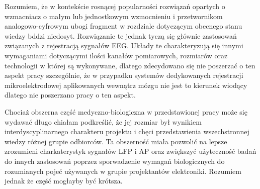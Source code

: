 \begin{frame}[t]
    \begin{block}{\dk}
    \end{block}

    Rozumiem, że w kontekście rosnącej popularności rozwiązań opartych o wzmacniacz o małym lub jednostkowym wzmocnieniu i przetwornikom analogowo-cyfrowym ubogi fragment w rozdziale dotyczącym obecnego stanu wiedzy bddzi niedosyt.
    Rozwiązanie te jednak tyczą  się głównie zastosowań związanych z rejestracją sygnałów EEG. Układy  te charakteryzują się innymi wymaganiami dotyczącymi ilości kanałów pomiarowych, rozmiarów oraz technologii w której są wykonywane, dlatego zdecydowano się nie poszerzać o ten aspekt pracy szczególnie, że w przypadku systemów dedykowanych rejestracji mikroelektrodowej aplikowanych wewnątrz mózgu nie jest to kierunek wiodący dlatego nie poszerzano pracy o ten aspekt.

\end{frame}


\begin{frame}[t]
    \begin{block}{\dk}
    \end{block}
    Chociaż obszerna część medyczno-biologiczna w przedstawionej pracy może się wydawać długo chiałam podkreślić, że jej rozmiar był wynikiem interdyscyplinarnego charakteru projektu i chęci przedstawienia wszechstronnej wiedzy różnej grupie odbiorców. Ta obszerność miała pozwolić na lepsze zrozumieni charkaterystyk sygnałów LFP i AP oraz zwiększyć użyteczność badań do innych zastosowań poprzez sporwadzenie wymagań biologicznych do rozumianych pojeć używanych w grupie projektantów elektroniki. Rozumiem jednak że część mogłayby być krótsza.
    

\end{frame}

